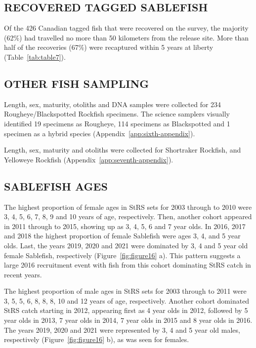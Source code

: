 \documentclass[12pt]{article}\usepackage[]{graphicx}\usepackage[]{color}
\begin{document}
\hypertarget{recovered-tagged-sablefish}{%
\subsection{RECOVERED TAGGED SABLEFISH}\label{recovered-tagged-sablefish}}

Of the 426 Canadian tagged fish that were recovered on the survey, the majority (62\%) had travelled no more than 50 kilometers from the release site. More than half of the recoveries (67\%) were recaptured within 5 years at liberty (Table~\ref{tab:table7}).

\hypertarget{other-fish-sampling}{%
\subsection{OTHER FISH SAMPLING}\label{other-fish-sampling}}

Length, sex, maturity, otoliths and DNA samples were collected for 234 Rougheye/Blackspotted Rockfish specimens. The science samplers visually identified 19 specimens as Rougheye, 114 specimens as Blackspotted and 1 specimen as a hybrid species (Appendix~\ref{app:sixth-appendix}).

Length, sex, maturity and otoliths were collected for Shortraker Rockfish, and Yelloweye Rockfish (Appendix~\ref{app:seventh-appendix}).

\hypertarget{sablefish-ages}{%
\subsection{SABLEFISH AGES}\label{sablefish-ages}}

The highest proportion of female ages in StRS sets for 2003 through to 2010 were 3, 4, 5, 6, 7, 8, 9 and 10 years of age, respectively. Then, another cohort appeared in 2011 through to 2015, showing up as 3, 4, 5, 6 and 7 year olds. In 2016, 2017 and 2018 the highest proportion of female Sablefish were ages 3, 4, and 5 year olds. Last, the years 2019, 2020 and 2021 were dominated by 3, 4 and 5 year old female Sablefish, respectively (Figure~\ref{fig:figure16} a). This pattern suggests a large 2016 recruitment event with fish from this cohort dominating StRS catch in recent years.

The highest proportion of male ages in StRS sets for 2003 through to 2011 were 3, 5, 5, 6, 8, 8, 8, 10 and 12 years of age, respectively. Another cohort dominated StRS catch starting in 2012, appearing first as 4 year olds in 2012, followed by 5 year olds in 2013, 7 year olds in 2014, 7 year olds in 2015 and 8 year olds in 2016. The years 2019, 2020 and 2021 were represented by 3, 4 and 5 year old males, respectively (Figure~\ref{fig:figure16} b), as was seen for females.
\end{document}
